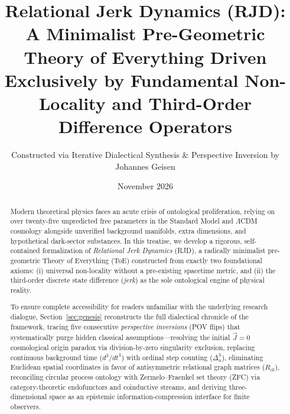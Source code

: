 \documentclass[11pt,a4paper]{article}
\title{\textbf{Relational Jerk Dynamics (RJD):}\\
\Large A Minimalist Pre-Geometric Theory of Everything Driven Exclusively by Fundamental Non-Locality and Third-Order Difference Operators}
\author{Constructed via Iterative Dialectical Synthesis \& Perspective Inversion by Johannes Geisen}
\date{November 2026}
\theoremstyle{plain}
\theoremstyle{definition}
\theoremstyle{remark}
\newcommand{\Jerk}{\vec{J}}
\begin{document}
\maketitle

\begin{abstract}
Modern theoretical physics faces an acute crisis of ontological proliferation, relying on over twenty-five unpredicted free parameters in the Standard Model and $\Lambda$CDM cosmology alongside unverified background manifolds, extra dimensions, and hypothetical dark-sector substances. In this treatise, we develop a rigorous, self-contained formalization of \emph{Relational Jerk Dynamics} (RJD), a radically minimalist pre-geometric Theory of Everything (ToE) constructed from exactly two foundational axioms: (i) universal non-locality without a pre-existing spacetime metric, and (ii) the third-order discrete state difference (\emph{jerk}) as the sole ontological engine of physical reality. 

To ensure complete accessibility for readers unfamiliar with the underlying research dialogue, Section~\ref{sec:genesis} reconstructs the full dialectical chronicle of the framework, tracing five consecutive \emph{perspective inversions} (POV flips) that systematically purge hidden classical assumptions—resolving the initial $\Jerk = 0$ cosmological origin paradox via division-by-zero singularity exclusion, replacing continuous background time ($d^3/dt^3$) with ordinal step counting ($\Delta^3_n$), eliminating Euclidean spatial coordinates in favor of antisymmetric relational graph matrices ($R_{ik}$), reconciling circular process ontology with Zermelo--Fraenkel set theory (ZFC) via category-theoretic endofunctors and coinductive streams, and deriving three-dimensional space as an epistemic information-compression interface for finite observers.


\end{abstract}
\end{document}
